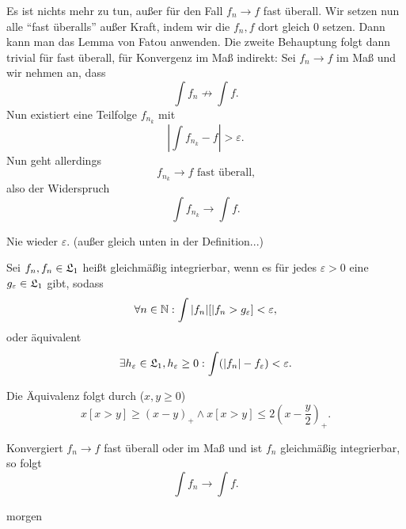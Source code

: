 			\begin{bew}
				Es ist nichts mehr zu tun, außer für den Fall $f_n\to f$ fast überall. Wir setzen nun alle "`fast überalls"' außer Kraft, indem wir die $f_n,f$ dort gleich 0 setzen. Dann kann man das Lemma von Fatou anwenden. \newline
				Die zweite Behauptung folgt dann trivial für fast überall, für Konvergenz im Maß indirekt: Sei $f_n\to f$ im Maß und wir nehmen an, dass
				\[ \int f_n\not\to\int f. \]
				Nun existiert eine Teilfolge $f_{n_k}$ mit 
				\[ \left|\int f_{n_k}-f\right|>\varepsilon. \]
				Nun geht allerdings 
				\[ f_{n_k}\to f\text{ fast überall,} \]
				also der Widerspruch
				\[ \int f_{n_k}\to\int f. \]
			\end{bew}
			
			\begin{bem}
				Nie wieder $\varepsilon$. (außer gleich unten in der Definition...)
			\end{bem}
			
			\begin{defi}
				Sei $f_n, f_n\in\mathfrak{L}_1$ heißt gleichmäßig integrierbar, wenn es für jedes $\varepsilon>0$ eine $g_\varepsilon\in\mathfrak{L}_1$ gibt, sodass
				\[ \forall n\in\mathbb{N}: \int |f_n|[|f_n>g_\varepsilon]<\varepsilon,  \]
				oder äquivalent
				\[ \exists h_\varepsilon\in\mathfrak{L}_1, h_\varepsilon\ge 0: \int (|f_n|-f_\varepsilon)<\varepsilon. \]
			\end{defi}
			
			\begin{bew}
				Die Äquivalenz folgt durch ($x,y\ge 0$)
				\[ x[x>y]\ge(x-y)_+ \land x[x>y]\le 2(x-\frac{y}{2})_+.\]
			\end{bew}
			
			\begin{satz}
				Konvergiert $f_n\to f$ fast überall oder im Maß und ist $f_n$ gleichmäßig integrierbar, so folgt
				\[ \int f_n\to\int f. \]
			\end{satz}
			
			\begin{bew}
				morgen
			\end{bew}